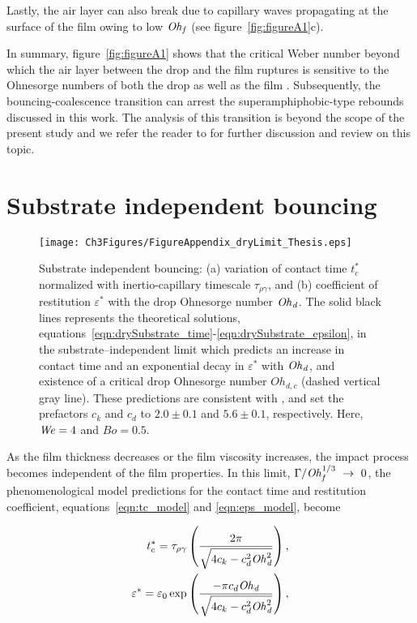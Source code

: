 \begin{subappendices}
	Lastly, the air layer can also break due to capillary waves propagating at the surface of the film owing to low $\mathit{Oh}_\mathit{f}$ (see figure~\ref{fig:figureA1}c). 
	
	In summary, figure~\ref{fig:figureA1} shows that the critical Weber number beyond which the air layer between the drop and the film ruptures is sensitive to the Ohnesorge numbers of both the drop as well as the film \citep{tang2016nonmonotonic, tang2018bouncing}. Subsequently, the bouncing-coalescence transition can arrest the superamphiphobic-type rebounds discussed in this work. The analysis of this transition is beyond the scope of the present study and we refer the reader to \citet{lohse-2020-pnas, SprittlesPhysRevLett.124.084501} for further discussion and review on this topic.
	
	\section{Substrate independent bouncing}
	\label{app:SubstrateIndependentBouncing}
	\begin{figure}
		\centering
		\texttt{[image: Ch3Figures/FigureAppendix\_dryLimit\_Thesis.eps]}
		\caption{Substrate independent bouncing: (a) variation of contact time $t_c^*$ normalized with inertio-capillary timescale $\tau_{\rho\gamma}$, and (b) coefficient of restitution $\varepsilon^*$ with the drop Ohnesorge number $\mathit{Oh}_\mathit{d}$. The solid black lines represents the theoretical solutions,  equations~\eqref{eqn:drySubstrate_time}-\eqref{eqn:drySubstrate_epsilon}, in the substrate--independent limit which predicts an increase in contact time and an exponential decay in $\varepsilon^*$ with $\mathit{Oh}_\mathit{d}$, and existence of a critical drop Ohnesorge number $Oh_{d,c}$ (dashed vertical gray line). These predictions are consistent with \citet{jha2020viscous}, and set the prefactors $c_{k}$ and $c_{d}$ to $2.0 \pm 0.1$ and $5.6 \pm 0.1$, respectively. Here, $\mathit{We} = 4$ and $Bo = 0.5$.}
		\label{fig:appendix_drylimit_figure}
	\end{figure}
	
	As the film thickness decreases or the film viscosity increases, the impact process becomes independent of the film properties. 
	In this limit, $\Gamma/\mathit{Oh}_\mathit{f}^{1/3}~\to~0$, the phenomenological model predictions for the contact time and restitution coefficient, equations~\eqref{eqn:tc_model} and \eqref{eqn:eps_model}, become
	
	\begin{align}
		\label{eqn:drySubstrate_time}
		t_c^*= \tau_{\rho\gamma} &\left(\frac{2\pi}{\sqrt{4c_{k} - c_{d}^{2} \mathit{Oh}_\mathit{d}^{2}}}\right),\\
		\label{eqn:drySubstrate_epsilon}
		\varepsilon^* = \varepsilon_0\exp &\left( \frac{-\pi c_{d} \mathit{Oh}_\mathit{d}}{\sqrt{4c_{k} - c_{d}^{2} \mathit{Oh}_\mathit{d}^{2}}} \right),
	\end{align}


\end{subappendices}
